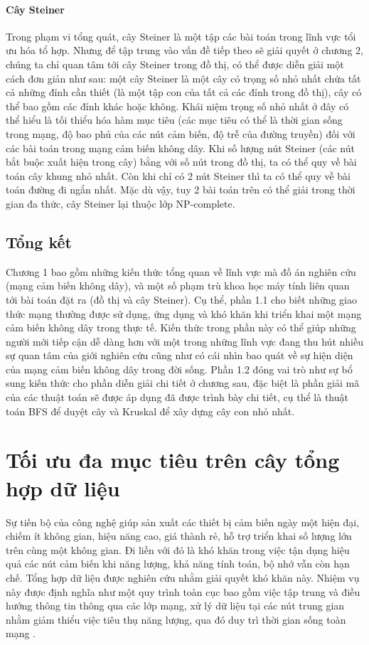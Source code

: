 \documentclass{hust}
\begin{document}
\subsubsection{Cây Steiner}
Trong phạm vi tổng quát, cây Steiner là một tập các bài toán trong lĩnh vực tổi ưu hóa tổ hợp. Nhưng để tập trung vào vấn đề tiếp theo sẽ giải quyết ở chương 2, chúng ta chỉ quan tâm tới cây Steiner trong đồ thị, có thể được diễn giải một cách đơn giản như sau: một cây Steiner là một cây có trọng số nhỏ nhất chứa tất cả những đỉnh cần thiết (là một tập con của tất cả các đỉnh trong đồ thị), cây có thể bao gồm các đỉnh khác hoặc không. Khái niệm trọng số nhỏ nhất ở đây có thể hiểu là tối thiểu hóa hàm mục tiêu (các mục tiêu có thể là thời gian sống trong mạng, độ bao phủ của các nút cảm biến, độ trễ của đường truyền) đối với các bài toán trong mạng cảm biến không dây. Khi số lượng nút Steiner (các nút bắt buộc xuất hiện trong cây) bằng với số nút trong đồ thị, ta có thể quy về bài toán cây khung nhỏ nhất. Còn khi chỉ có 2 nút Steiner thì ta có thể quy về bài toán đường đi ngắn nhất. Mặc dù vậy, tuy 2 bài toán trên có thể giải trong thời gian đa thức, cây Steiner lại thuộc lớp NP-complete.\cite{karp1972reducibility}

\section{Tổng kết}
Chương 1 bao gồm những kiến thức tổng quan về lĩnh vực mà đồ án nghiên cứu (mạng cảm biến không dây), và một số phạm trù khoa học máy tính liên quan tới bài toán đặt ra (đồ thị và cây Steiner). Cụ thể, phần 1.1 cho biết những giao thức mạng thường được sử dụng, ứng dụng và khó khăn khi triển khai một mạng cảm biến không dây trong thực tế. Kiến thức trong phần này có thể giúp những người mới tiếp cận dễ dàng hơn với một trong những lĩnh vực đang thu hút nhiều sự quan tâm của giới nghiên cứu cũng như có cái nhìn bao quát về sự hiện diện của mạng cảm biến không dây trong đời sống. Phần 1.2 đóng vai trò như sự bổ sung kiến thức cho phần diễn giải chi tiết ở chương sau, đặc biệt là phần giải mã của các thuật toán sẽ được áp dụng đã được trình bày chi tiết, cụ thể là thuật toán \gls{BFS} để duyệt cây và Kruskal để xây dựng cây con nhỏ nhất.

\chapter{Tối ưu đa mục tiêu trên cây tổng hợp dữ liệu} %
Sự tiến bộ của công nghệ giúp sản xuất các thiết bị cảm biến ngày một hiện đại, chiếm ít không gian, hiệu năng cao, giá thành rẻ, hỗ trợ triển khai số lượng lớn trên cùng một không gian. Đi liền với đó là khó khăn trong việc tận dụng hiệu quả các nút cảm biến khi năng lượng, khả năng tính toán, bộ nhớ vẫn còn hạn chế. Tổng hợp dữ liệu được nghiên cứu nhằm giải quyết khó khăn này. Nhiệm vụ này được định nghĩa như một quy trình toàn cục bao gồm việc tập trung và điều hướng thông tin thông qua các lớp mạng, xử lý dữ liệu tại các nút trung gian nhằm giảm thiểu việc tiêu thụ năng lượng, qua đó duy trì thời gian sống toàn mạng \cite{fasolo2007network}.
\end{document}
